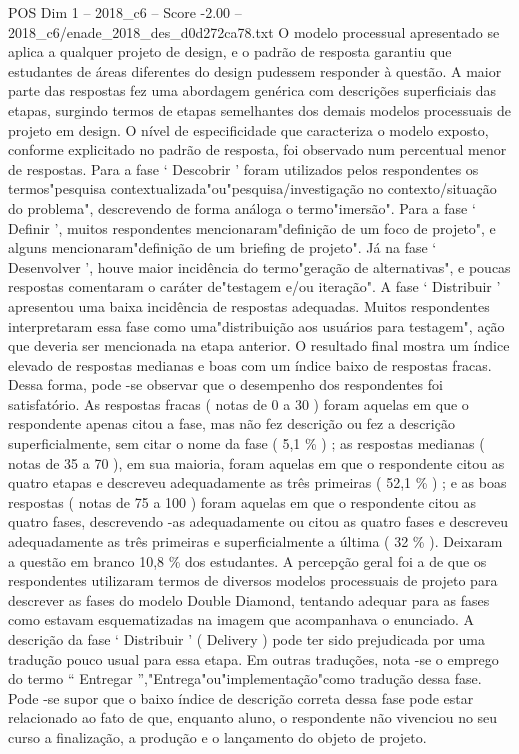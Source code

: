\begin{textsample}{POS Dim 1 – 2018\_c6 – Score -2.00 – 2018\_c6/enade\_2018\_des\_d0d272ca78.txt}
O modelo processual apresentado se aplica a qualquer projeto de design, e o padrão de resposta garantiu que estudantes de áreas diferentes do design pudessem responder à questão.
A maior parte das respostas fez uma abordagem genérica com descrições superficiais das etapas, surgindo termos de etapas semelhantes dos demais modelos processuais de projeto em design.
O nível de especificidade que caracteriza o modelo exposto, conforme explicitado no padrão de resposta, foi observado num percentual menor de respostas.
Para a fase ‘ Descobrir ’ foram utilizados pelos respondentes os termos"pesquisa contextualizada"ou"pesquisa/investigação no contexto/situação do problema", descrevendo de forma análoga o termo"imersão".
Para a fase ‘ Definir ’, muitos respondentes mencionaram"definição de um foco de projeto", e alguns mencionaram"definição de um briefing de projeto".
Já na fase ‘ Desenvolver ’, houve maior incidência do termo"geração de alternativas", e poucas respostas comentaram o caráter de"testagem e/ou iteração".
A fase ‘ Distribuir ’ apresentou uma baixa incidência de respostas adequadas.
Muitos respondentes interpretaram essa fase como uma"distribuição aos usuários para testagem", ação que deveria ser mencionada na etapa anterior.
O resultado final mostra um índice elevado de respostas medianas e boas com um índice baixo de respostas fracas.
Dessa forma, pode -se observar que o desempenho dos respondentes foi satisfatório.
As respostas fracas ( notas de 0 a 30 ) foram aquelas em que o respondente apenas citou a fase, mas não fez descrição ou fez a descrição superficialmente, sem citar o nome da fase ( 5,1 \% ) ; as respostas medianas ( notas de 35 a 70 ), em sua maioria, foram aquelas em que o respondente citou as quatro etapas e descreveu adequadamente as três primeiras ( 52,1 \% ) ; e as boas respostas ( notas de 75 a 100 ) foram aquelas em que o respondente citou as quatro fases, descrevendo -as adequadamente ou citou as quatro fases e descreveu adequadamente as três primeiras e superficialmente a última ( 32 \% ).
Deixaram a questão em branco 10,8 \% dos estudantes.
A percepção geral foi a de que os respondentes utilizaram termos de diversos modelos processuais de projeto para descrever as fases do modelo Double Diamond, tentando adequar para as fases como estavam esquematizadas na imagem que acompanhava o enunciado.
A descrição da fase ‘ Distribuir ’ ( Delivery ) pode ter sido prejudicada por uma tradução pouco usual para essa etapa.
Em outras traduções, nota -se o emprego do termo “ Entregar ”,"Entrega"ou"implementação"como tradução dessa fase.
Pode -se supor que o baixo índice de descrição correta dessa fase pode estar relacionado ao fato de que, enquanto aluno, o respondente não vivenciou no seu curso a finalização, a produção e o lançamento do objeto de projeto.

\end{textsample}
